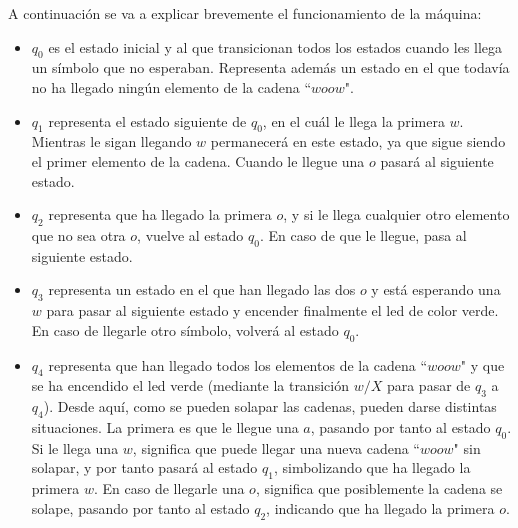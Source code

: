 \documentclass[11pt,a4paper]{article}
\begin{document}
		\begin{center}
		\end{center}
		
		A continuación se va a explicar brevemente el funcionamiento de la máquina:
		
		\begin{itemize}
			\item $q_0$ es el estado inicial y al que transicionan todos los estados cuando les llega un símbolo que no
			esperaban. Representa además un estado en el que todavía no ha llegado ningún elemento de la cadena ``$woow$".
			\item $q_1$ representa el estado siguiente de $q_0$, en el cuál le llega la primera $w$. Mientras le sigan
			llegando $w$ permanecerá en este estado, ya que sigue siendo el primer elemento de la cadena. Cuando le llegue
			una $o$ pasará al siguiente estado.
			\item $q_2$ representa que ha llegado la primera $o$, y si le llega cualquier otro elemento que no sea otra
			$o$, vuelve al estado $q_0$. En caso de que le llegue, pasa al siguiente estado.
			\item $q_3$ representa un estado en el que han llegado las dos $o$ y está esperando una $w$ para pasar al
			siguiente estado y encender finalmente el led de color verde. En caso de llegarle otro símbolo, volverá al 
			estado $q_0$.
			\item $q_4$ representa que han llegado todos los elementos de la cadena ``$woow$" y que se ha encendido el led
			verde (mediante la transición $w/X$ para pasar de $q_3$ a $q_4$). Desde aquí, como se pueden solapar las
			cadenas, pueden darse distintas situaciones. La primera es que le llegue una $a$, pasando por tanto al estado
			$q_0$. Si le llega una $w$, significa que puede llegar una nueva cadena ``$woow$" sin solapar, y por tanto pasará
			al estado $q_1$, simbolizando que ha llegado la primera $w$. En caso de llegarle una $o$, significa que
			posiblemente la cadena se solape, pasando por tanto al estado $q_2$, indicando que ha llegado la primera $o$.
		\end{itemize}
		
\end{document}
